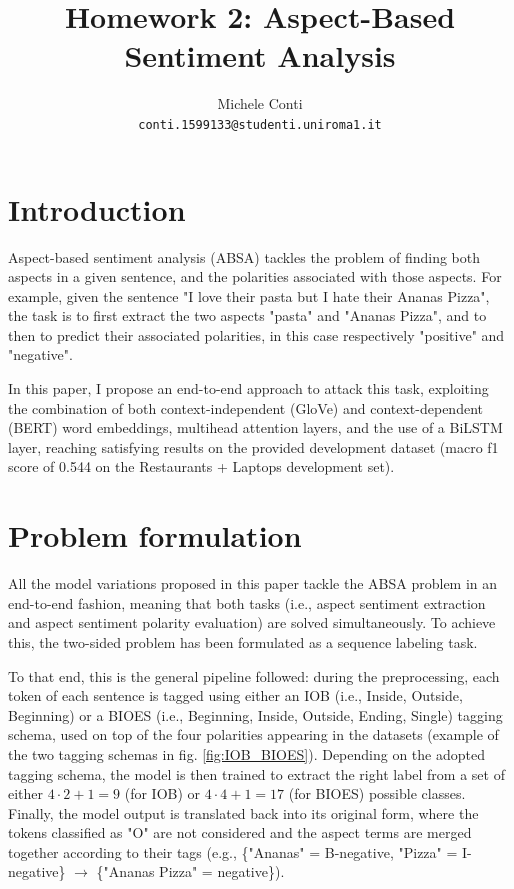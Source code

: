 \documentclass[11pt,a4paper]{article}
\title{Homework 2: Aspect-Based Sentiment Analysis}
\author{Michele Conti \\
	\texttt{conti.1599133@studenti.uniroma1.it}\\}
\date{}
\begin{document}
	\maketitle
	\section{Introduction}
	Aspect-based sentiment analysis (ABSA) tackles the problem of finding both
	aspects in a given sentence, and the polarities associated with those aspects.
	For example, given the sentence "I love their pasta but I hate their Ananas
	Pizza", the task is to first extract the two aspects "pasta" and "Ananas Pizza",
	and to then to predict their associated polarities, in this case respectively
	"positive" and "negative".
	
	In this paper, I propose an end-to-end approach to attack this task, exploiting
	the combination of both context-independent (GloVe) and context-dependent (BERT)
	word embeddings, multihead attention layers, and the use of a BiLSTM layer,
	reaching satisfying results on the provided development dataset (macro f1 score
	of 0.544 on the Restaurants + Laptops development set).
	
	\section{Problem formulation}
	All the model variations proposed in this paper tackle the ABSA problem in an
	end-to-end fashion, meaning that both tasks (i.e., aspect sentiment extraction
	and aspect sentiment polarity evaluation) are solved simultaneously. To achieve
	this, the two-sided problem has been formulated as a sequence labeling task. 
	
	To that end, this is the general pipeline followed: during the preprocessing,
	each token of each sentence is tagged using either an IOB (i.e., Inside,
	Outside, Beginning) or a BIOES (i.e., Beginning, Inside, Outside, Ending,
	Single) tagging schema, used on top of the four polarities appearing in the
	datasets (example of the two tagging schemas in fig. \ref{fig:IOB_BIOES}).
	Depending on the adopted tagging schema, the model is then trained to extract
	the right label from a set of either  $4 \cdot 2 + 1 = 9$ (for IOB) or $4 \cdot
	4 + 1 = 17$ (for BIOES) possible classes. Finally, the model output is
	translated back into its original form, where the tokens classified as "O" are
	not considered and the aspect terms are merged together according to their tags
	(e.g., \{"Ananas" = B-negative, "Pizza" = I-negative\} $\to$ \{"Ananas Pizza" =
	negative\}).
	
\end{document}
